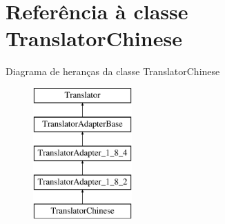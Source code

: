 \hypertarget{class_translator_chinese}{\section{Referência à classe Translator\-Chinese}
\label{class_translator_chinese}
}
Diagrama de heranças da classe Translator\-Chinese\begin{figure}[H]
\begin{center}
\leavevmode
\includegraphics[height=5.000000cm]{class_translator_chinese}
\end{center}
\end{figure}

